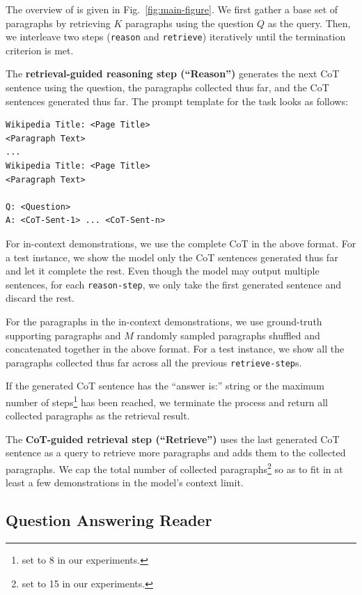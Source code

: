 The overview of \iconsys is given in Fig.~\ref{fig:main-figure}. We first gather a base set of paragraphs by retrieving $K$ paragraphs using the question $Q$ as the query. Then, we interleave two steps (\texttt{reason} and \texttt{retrieve}) iteratively until the termination criterion is met.

The \textbf{retrieval-guided reasoning step (``Reason'')} generates the next CoT sentence using the question, the paragraphs collected thus far, and the CoT sentences generated thus far. The prompt template for the task looks as follows:

\begin{small}
\begin{verbatim}
Wikipedia Title: <Page Title>
<Paragraph Text>
...
Wikipedia Title: <Page Title>
<Paragraph Text>

Q: <Question>
A: <CoT-Sent-1> ... <CoT-Sent-n>
\end{verbatim}
\end{small}
 
For in-context demonstrations, we use the complete CoT in the above format. For a test instance, we show the model only the CoT sentences generated thus far and let it complete the rest. Even though the model may output multiple sentences, for each \texttt{reason-step}, we only take the first generated sentence and discard the rest.

For the paragraphs in the in-context demonstrations, we use ground-truth supporting paragraphs and $M$ randomly sampled paragraphs shuffled and concatenated together in the above format. For a test instance, we show all the paragraphs collected thus far across all the previous \texttt{retrieve-step}s.

If the generated CoT sentence has the ``answer is:'' string or the maximum number of steps\footnote{set to 8 in our experiments.} has been reached, we terminate the process and return all collected paragraphs as the retrieval result.

The \textbf{CoT-guided retrieval step (``Retrieve'')} uses the last generated CoT sentence as a query to retrieve more paragraphs and adds them to the collected paragraphs. We cap the total number of collected paragraphs\footnote{set to 15 in our experiments.} so as to fit in at least a few demonstrations in the model's context limit.


\subsection{Question Answering Reader}
\label{subsec:reader}

